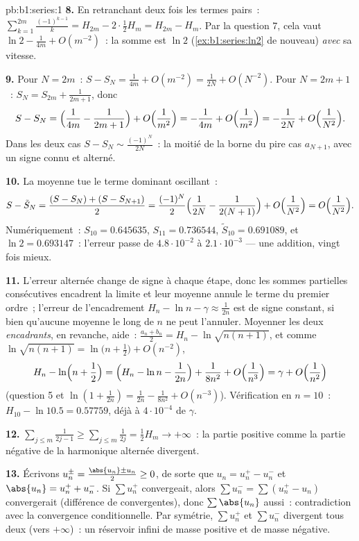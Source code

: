 \begin{solution}{pb:b1:series:1}
\textbf{8.} En retranchant deux fois les termes pairs~:
$\sum_{k=1}^{2m}\frac{(-1)^{k-1}}{k} = H_{2m} - 2\cdot\frac12
H_m = H_{2m} - H_m$. Par la question 7, cela vaut $\ln 2 -
\frac{1}{4m} + O(m^{-2})$~: la somme est $\ln 2$
(\cref{ex:b1:series:ln2} de nouveau) \emph{avec} sa vitesse.

\textbf{9.} Pour $N = 2m$~: $S - S_N = \frac{1}{4m} + O(m^{-2}) =
\frac{1}{2N} + O(N^{-2})$. Pour $N = 2m + 1$~: $S_{N} = S_{2m} +
\frac{1}{2m+1}$, donc
\[
S - S_N = \Bigl(\frac{1}{4m} - \frac{1}{2m+1}\Bigr) +
O\Bigl(\frac{1}{m^2}\Bigr)
= -\frac{1}{4m} + O\Bigl(\frac{1}{m^2}\Bigr)
= -\frac{1}{2N} + O\Bigl(\frac{1}{N^2}\Bigr).
\]
Dans les deux cas $S - S_N \sim \frac{(-1)^N}{2N}$~: la moitié de la
borne du pire cas $a_{N+1}$, avec un signe connu et alterné.

\textbf{10.} La moyenne tue le terme dominant oscillant~:
\[
S - \tilde S_N = \frac{(S - S_N) + (S - S_{N+1})}{2}
= \frac{(-1)^N}{2}\Bigl(\frac{1}{2N} - \frac{1}{2(N+1)}\Bigr)
+ O\Bigl(\frac{1}{N^2}\Bigr) = O\Bigl(\frac{1}{N^2}\Bigr).
\]
Numériquement~: $S_{10} = 0.645635$, $S_{11} = 0.736544$, $\tilde
S_{10} = 0.691089$, et $\ln 2 = 0.693147$~: l'erreur passe de
$4.8\cdot10^{-2}$ à $2.1\cdot10^{-3}$ --- une addition, vingt fois
mieux.

\textbf{11.} L'erreur alternée change de signe à chaque étape, donc
les sommes partielles consécutives encadrent la limite et leur
moyenne annule le terme du premier ordre~; l'erreur de l'encadrement
$H_n - \ln n - \gamma \approx \frac{1}{2n}$ est de signe constant, si
bien qu'aucune moyenne le long de $n$ ne peut l'annuler. Moyenner les
deux \emph{encadrants}, en revanche, aide~: $\frac{a_n + b_n}{2} =
H_n - \ln\sqrt{n(n+1)}$, et comme
$\ln\sqrt{n(n+1)} = \ln\bigl(n + \frac12\bigr) + O(n^{-2})$,
\[
H_n - \ln\Bigl(n + \frac12\Bigr)
= \Bigl(H_n - \ln n - \frac{1}{2n}\Bigr) + \frac{1}{8n^2} +
O\Bigl(\frac{1}{n^3}\Bigr) = \gamma + O\Bigl(\frac{1}{n^2}\Bigr)
\]
(question 5 et $\ln(1 + \frac{1}{2n}) = \frac{1}{2n} -
\frac{1}{8n^2} + O(n^{-3})$). Vérification en $n = 10$~: $H_{10} -
\ln 10.5 = 0.57759$, déjà à $4\cdot10^{-4}$ de $\gamma$.

\textbf{12.} $\sum_{j\leq m} \frac{1}{2j-1} \geq \sum_{j \leq m}
\frac{1}{2j} = \frac12 H_m \to +\infty$~: la partie positive comme la
partie négative de la  harmonique alternée divergent.

\textbf{13.} Écrivons $u_n^\pm = \frac{\abs{u_n} \pm u_n}{2} \geq
0$, de sorte que $u_n = u_n^+ - u_n^-$ et $\abs{u_n} = u_n^+ +
u_n^-$. Si $\sum u_n^+$ convergeait, alors $\sum u_n^- = \sum (u_n^+
- u_n)$ convergerait (différence de  convergentes), donc $\sum
\abs{u_n}$ aussi~: contradiction avec la convergence conditionnelle.
Par symétrie, $\sum u_n^+$ et $\sum u_n^-$ divergent tous deux (vers
$+\infty$)~: un réservoir infini de masse positive et de masse
négative.


\end{solution}
